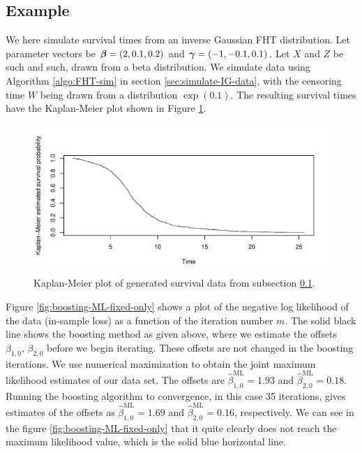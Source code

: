\subsection{Example}\label{subsec:algo-example}
We here simulate survival times from an inverse Gaussian FHT distribution.
Let parameter vectors be $\boldsymbol{\beta}=(2,0.1,0.2)$ and $\boldsymbol{\gamma}=(-1, -0.1, 0.1)$.
Let $X$ and $Z$ be such and such, drawn from a beta distribution.
We simulate data using Algorithm \ref{algo:FHT-sim} in section \ref{sec:simulate-IG-data}, with the censoring time $W$ being drawn from a distribution $\exp(0.1)$.
The resulting survival times have the Kaplan-Meier plot shown in Figure \ref{fig:small-example-kaplan-meier}.
\begin{figure}
\caption{Kaplan-Meier plot of generated survival data from subsection \ref{subsec:algo-example}.}
\label{fig:small-example-kaplan-meier}
\centering\includegraphics[scale=0.4]{figures/case1.pdf}
\end{figure}
Figure \ref{fig:boosting-ML-fixed-only} shows a plot of the negative log likelihood of the data (in-sample loss) as a function of the iteration number $m$.
The solid black line shows the boosting method as given above, where we estimate the offsets $\beta_{1,0},\,\beta_{2,0}$ before we begin iterating.
These offsets are not changed in the boosting iterations.
We use numerical maximization to obtain the joint maximum likelihood estimates of our data set.
The offsets are $\hat{\beta}^{\text{ML}}_{1,0}=1.93$ and $\hat{\beta}^{\text{ML}}_{2,0}=0.18$.
Running the boosting algorithm to convergence, in this case 35 iterations, gives estimates of the offsets as $\hat{\beta}^{\text{ML}}_{1,0}=1.69$ and $\hat{\beta}^{\text{ML}}_{2,0}=0.16$, respectively.
We can see in the figure \ref{fig:boosting-ML-fixed-only} that it quite clearly does not reach the maximum likelihood value, which is the solid blue horizontal line.

